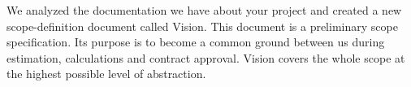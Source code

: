 We analyzed the documentation we have about your project and 
created a new scope-definition document called Vision. This document
is a preliminary scope specification. Its purpose is to become
a common ground between us during estimation, calculations and contract
approval. Vision covers the whole scope at the highest possible level
of abstraction.
